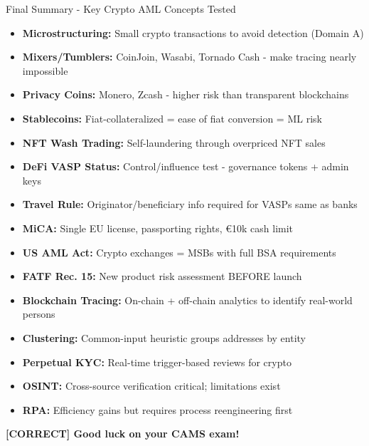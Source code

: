\documentclass[11pt,a4paper]{beamer}
\newcommand{\greennote}[1]{\textcolor{green!50!black}{\textbf{[CORRECT] #1}}}
\begin{document}
\begin{frame}{Final Summary - Key Crypto AML Concepts Tested}
\begin{itemize}
    \item \textbf{Microstructuring:} Small crypto transactions to avoid detection (Domain A)
    \item \textbf{Mixers/Tumblers:} CoinJoin, Wasabi, Tornado Cash - make tracing nearly impossible
    \item \textbf{Privacy Coins:} Monero, Zcash - higher risk than transparent blockchains
    \item \textbf{Stablecoins:} Fiat-collateralized = ease of fiat conversion = ML risk
    \item \textbf{NFT Wash Trading:} Self-laundering through overpriced NFT sales
    \item \textbf{DeFi VASP Status:} Control/influence test - governance tokens + admin keys
    \item \textbf{Travel Rule:} Originator/beneficiary info required for VASPs same as banks
    \item \textbf{MiCA:} Single EU license, passporting rights, €10k cash limit
    \item \textbf{US AML Act:} Crypto exchanges = MSBs with full BSA requirements
    \item \textbf{FATF Rec. 15:} New product risk assessment BEFORE launch
    \item \textbf{Blockchain Tracing:} On-chain + off-chain analytics to identify real-world persons
    \item \textbf{Clustering:} Common-input heuristic groups addresses by entity
    \item \textbf{Perpetual KYC:} Real-time trigger-based reviews for crypto
    \item \textbf{OSINT:} Cross-source verification critical; limitations exist
    \item \textbf{RPA:} Efficiency gains but requires process reengineering first
\end{itemize}
\vspace{0.3cm}
\centering
\greennote{Good luck on your CAMS exam!}
\end{frame}
\end{document}
